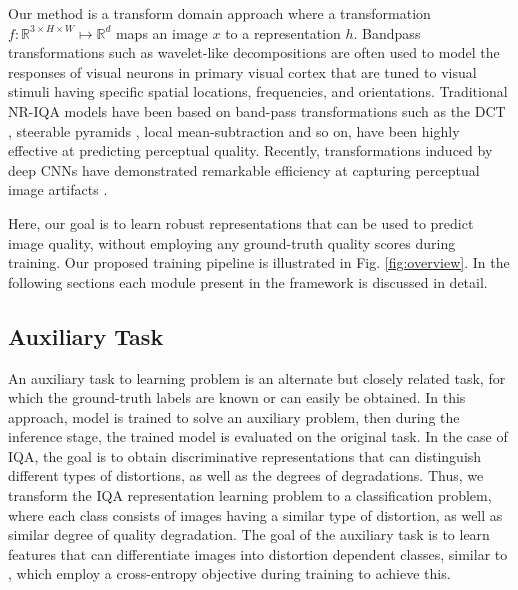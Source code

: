 \documentclass[journal]{IEEEtran}
\begin{document}
Our method is a transform domain approach where a transformation $f:\mathbb{R}^{3 \times H \times W} \mapsto \mathbb{R}^d$ maps an image $x$ to a representation $h$. Bandpass transformations such as wavelet-like decompositions are often used to model the responses of visual neurons in primary visual cortex that are tuned to visual stimuli having specific spatial locations, frequencies, and orientations. Traditional NR-IQA models have been based on band-pass transformations such as the DCT \cite{saad2012blind}, steerable pyramids \cite{moorthy2011blind}, local mean-subtraction \cite{mittal2012no,mittal2013making} and so on, have been highly effective at predicting perceptual quality. Recently, transformations induced by deep CNNs have demonstrated remarkable efficiency at capturing perceptual image artifacts \cite{zhang2018blind,su2020blindly,zeng2017probabilistic}.

Here, our goal is to learn robust representations that can be used to predict image quality, without employing any ground-truth quality scores during training. Our proposed training pipeline is illustrated in Fig. \ref{fig:overview}. In the following sections each module present in the framework is discussed in detail. 

\subsection{Auxiliary Task}
An auxiliary task to learning problem is an alternate but closely related task, for which the ground-truth labels are known or can easily be obtained. In this approach, model is trained to solve an auxiliary problem, then during the inference stage, the trained model is evaluated on the original task. In the case of IQA, the goal is to obtain discriminative representations that can distinguish different types of distortions, as well as the degrees of degradations. Thus, we transform the IQA representation learning problem to a classification problem, where each class consists of images having a similar type of distortion, as well as similar degree of quality degradation. The goal of the auxiliary task is to learn features that can differentiate images into distortion dependent classes, similar to \cite{zhang2018blind,kim2020dynamic}, which employ a cross-entropy objective during training to achieve this.
\end{document}
